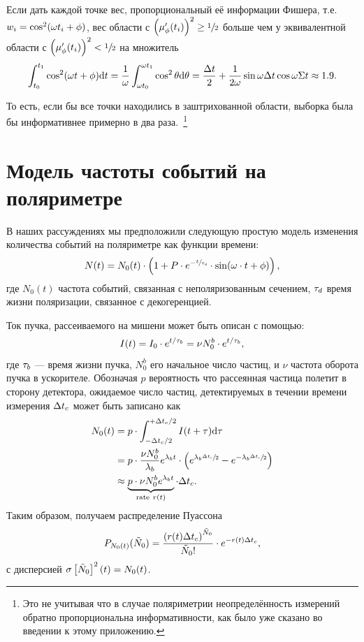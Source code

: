 Если дать каждой точке вес, пропорциональный её информации Фишера, т.е. $w_i = \cos^2(\omega t_i + \phi)$, вес области с $\bkt{\mupp}^2 \geq\sfrac12$ больше чем у эквивалентной области с $\bkt{\mupp}^2 < \sfrac12$ на множитель
\begin{align*}
\int_{t_0}^{t_1}\cos^2(\omega t + \phi)\mathrm{d} t = \frac1{\omega}\int_{\omega t_0}^{\omega t_1} \cos^2\theta\mathrm{d}\theta = \frac{\Delta t}{2} + \frac{1}{2\omega}\sin\omega\Delta t\cos\omega\Sigma t \approx 1.9.
\end{align*}

То есть, если бы все точки находились в заштрихованной области, выборка была бы информативнее примерно в два раза.~\footnote{Это не учитывая что в случае поляриметрии неопределённость измерений обратно пропорциональна информативности, как было уже сказано во введении к этому приложению.}

\section{Модель частоты событий на поляриметре}\label{Apx:Stats:Detector_counting_rate}
В наших рассуждениях мы предположили следующую простую модель
изменения количества событий на поляриметре как функции времени:
\begin{equation}\label{eq:DetCntRt}
N(t) = N_0(t)\cdot\bkt{1 + P\cdot e^{-\sfrac{t}{\LTd}}\cdot\sin(\w\cdot t + \phi)},
\end{equation}
где $N_0(t)$ частота событий, связанная с неполяризованным сечением,
$\tau_d$ время жизни поляризации, связанное с декогеренцией.

Ток пучка, рассеиваемого на мишени может быть описан с помощью:
\[
I(t)= I_0\cdot e^{t/\tau_b} = \nu N_0^b\cdot e^{t/\tau_b},
\]
где $\tau_b$ --- время жизни пучка, $N_0^b$ его начальное число частиц,
и $\nu$ частота оборота пучка в ускорителе. Обозначая $p$ вероятность
что рассеянная частица полетит в сторону детектора, ожидаемое число
частиц, детектируемых в течении времени измерения $\Delta t_{c}$ может быть
записано как
\begin{align}
N_0(t) & = p\cdot\int_{-\dtc/2}^{+\dtc/2} I(t+\tau)\rd\tau \notag                    \\
& = p\cdot\frac{\nu N_0^b}{\lamb} e^{\lamb t}\cdot \bkt{e^{\lamb\sfrac{\dtc}{2}} - e^{-\lamb\sfrac{\dtc}{2}}} \notag \\
& \approx \underbrace{p\cdot\nu N_0^b e^{\lamb t}}_{\text{rate}~r(t)} \cdot\dtc.
\end{align}
Таким образом, получаем распределение Пуассона
\[
P_{N_0(t)}(\tilde{N}_0) = \frac{\bkt{r(t)\dtc}^{\tilde{N}_0}}{\tilde{N}_0!}\cdot e^{-r(t)\dtc},
\]
с дисперсией $\SD{\tilde{N}_0}^2(t) = N_0(t)$. %

